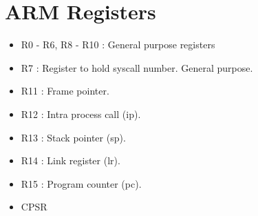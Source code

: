 \documentclass{article}
\begin{document}
	\section{ARM Registers}
	\begin{itemize}
		\item R0 - R6, R8 - R10 : General purpose registers
		\item R7 : Register to hold syscall number. General purpose.
		\item R11 : Frame pointer.
		\item R12 : Intra process call (ip).
		\item R13 : Stack pointer (sp).
		\item R14 : Link register (lr).
		\item R15 : Program counter (pc).
		\item CPSR
	\end{itemize}
\end{document}
